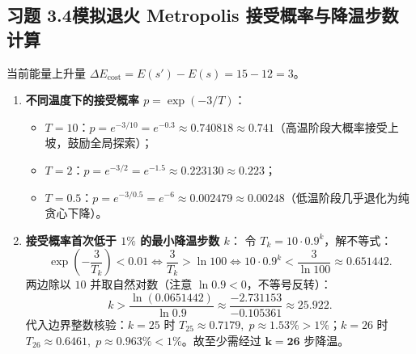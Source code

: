 \subsection*{习题 3.4\quad 模拟退火 Metropolis 接受概率与降温步数计算}
当前能量上升量 $\Delta E_{\text{cost}} = E(s') - E(s) = 15 - 12 = 3$。
\begin{enumerate}[label=(\arabic*), leftmargin=1.8em]
  \item \textbf{不同温度下的接受概率 $p = \exp(-3 / T)$}：
  \begin{itemize}
    \item $T = 10$：$p = e^{-3/10} = e^{-0.3} \approx 0.740818 \approx \mathbf{0.741}$（高温阶段大概率接受上坡，鼓励全局探索）；
    \item $T = 2$：$p = e^{-3/2} = e^{-1.5} \approx 0.223130 \approx \mathbf{0.223}$；
    \item $T = 0.5$：$p = e^{-3/0.5} = e^{-6} \approx 0.002479 \approx \mathbf{0.00248}$（低温阶段几乎退化为纯贪心下降）。
  \end{itemize}
  \item \textbf{接受概率首次低于 $1\%$ 的最小降温步数 $k$}：
  令 $T_k = 10 \cdot 0.9^k$，解不等式：
  \[
    \exp\!\left(-\frac{3}{T_k}\right) < 0.01
    \iff \frac{3}{T_k} > \ln 100
    \iff 10 \cdot 0.9^k < \frac{3}{\ln 100} \approx 0.651442.
  \]
  两边除以 $10$ 并取自然对数（注意 $\ln 0.9 < 0$，不等号反转）：
  \[
    k > \frac{\ln(0.0651442)}{\ln 0.9} \approx \frac{-2.731153}{-0.105361} \approx 25.922.
  \]
  代入边界整数核验：$k=25$ 时 $T_{25}\approx 0.7179,\; p \approx 1.53\% > 1\%$；$k=26$ 时 $T_{26} \approx 0.6461,\; p \approx 0.963\% < 1\%$。故至少需经过 $\mathbf{k = 26}$ 步降温。
\end{enumerate}

